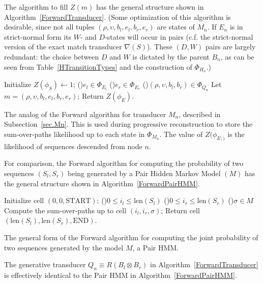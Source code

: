 \documentclass{article}
\newcommand{\secref}[1]{Subsection~\ref{sec.#1}}
\newcommand\compose{}
\newcommand\fork{\otimes}
\newcommand\recognize{\nabla}
\newcommand\States{\Phi}
\newcommand\statesof[1]{\States_{#1}}
\newcommand\startstate{\phi_S}
\newcommand\laststate{\phi_E}
\newcommand\laststateof[1]{\phi_{E;#1}}
\newcommand\seqlen[1]{\mbox{len}(#1)}
\newcommand\mstate{(\rho,\upsilon,b_l,e_l,b_r,e_r)}
\newcommand\qstate{(\rho,\upsilon,b_l,b_r)}
\begin{document}
The algorithm to fill $Z(m)$ has the general structure shown in Algorithm~\ref{ForwardTransducer}.
(Some optimization of this algorithm is desirable, since not all tuples $\mstate$ are states of $M_n$.
If $E_n$ is in strict-normal form its $W$- and $D$-states will occur in pairs
(c.f. the strict-normal version of the exact match transducer $\recognize(S)$).
These $(D,W)$ pairs are largely redundant: the choice between $D$ and $W$ is dictated by the parent $B_n$,
as can be seen from Table~\ref{HTransitionTypes} and the construction of $\statesof{H_n}$.)

\begin{algorithm}
  Initialize $Z(\startstate) \leftarrow 1$;
  \BlankLine
  \ForEach(){$e_l \in \statesof{E_l}$} {
    \ForEach(){$e_r \in \statesof{E_r}$} {
      \ForEach(){$\qstate \in \statesof{Q_n}$} {
        Let $m = \mstate$;
        \BlankLine
        \If{$m \in \statesof{M_n}$}{
          Compute $Z(m)$;
        }
      }
    }
  }
  Return $Z(\laststate)$.
\caption{\label{ForwardTransducer}
The analog of the Forward algorithm for transducer $M_n$, described in \secref{Mn}. This is used during progressive reconstruction to store the sum-over-paths likelihood up to each state in $\statesof{M_n}$.  The value of $Z(\laststateof)$ is the likelihood of sequences descended from node $n$. 
}
\end{algorithm}

For comparison, the Forward algorithm for computing the probability of two sequences $(S_l,S_r)$
being generated by a Pair Hidden Markov Model $(M)$ has the general structure shown in Algorithm~\ref{ForwardPairHMM}.

\begin{algorithm}
  Initialize cell $(0,0,\mbox{START})$;
  \BlankLine
  \ForEach(){$0 \leq i_l \leq \seqlen{S_l}$} {
    \ForEach(){$0 \leq i_r \leq \seqlen{S_r}$} {
      \ForEach(){$\sigma \in M$} {
        Compute the sum-over-paths up to cell $(i_l,i_r,\sigma)$;
      }
    }
  }
  Return cell $(\seqlen{S_l},\seqlen{S_r},\mbox{END})$.
\caption{\label{ForwardPairHMM}
The general form of the Forward algorithm for computing the joint probability of two sequences generated by the model $M$, a  Pair HMM.  
}
\end{algorithm}

The generative transducer $Q_n \equiv R \compose (B_l \fork B_r)$
in Algorithm~\ref{ForwardTransducer} is effectively identical to the Pair HMM in Algorithm~\ref{ForwardPairHMM}.
\end{document}
